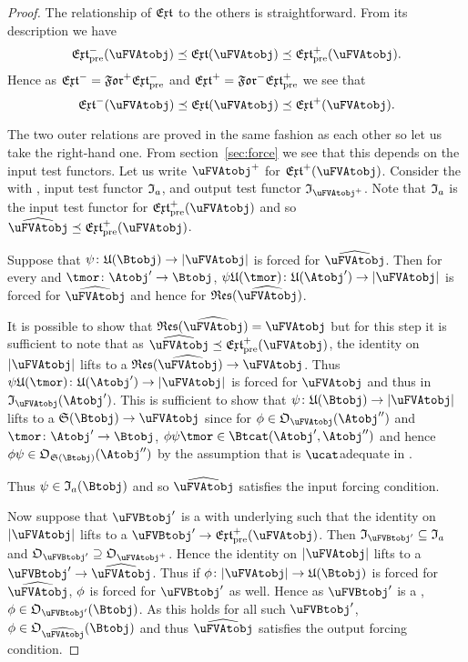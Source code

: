 \documentclass[%
12pt,%
arxiv,%
defaults
]{myclass}
\begin{document}
\begin{proof}
The relationship of \(\extfunc\) to the others is straightforward.
From its description we have
%
\[
  \PMextfunc(\uFVAtobj) \preceq \extfunc(\uFVAtobj) \preceq \PJextfunc(\uFVAtobj).
\]
%
Hence as \(\Mextfunc = \Mforfunc \PMextfunc\) and \(\Jextfunc = \Jforfunc \PJextfunc\) we see that
%
\[
  \Mextfunc(\uFVAtobj) \preceq \extfunc(\uFVAtobj) \preceq \Jextfunc(\uFVAtobj).
\]

The two outer relations are proved in the same fashion as each other so let us take the right\hyp{}hand one.
From section~\ref{sec:force} we see that this depends on the input test functors.
Let us write \(\mMo{\uFVAtobj}\) for \(\Jextfunc(\uFVAtobj)\).
Consider the \uVBtobj[\widehat{\uFVAtobj}] with \uobj[{\forfunc[\uFVAtobj]}], input test functor \(\itest_a\), and output test functor \(\itest_{\mMo{\uFVAtobj}}\).
Note that \(\itest_a\) is the input test functor for \(\PJextfunc(\uFVAtobj)\) and so \(\widehat{\uFVAtobj} \preceq \PJextfunc(\uFVAtobj)\).

Suppose that \(\ifn \colon \ufunc(\Btobj) \to \forfunc[\uFVAtobj]\) is forced for \(\widehat{\uFVAtobj}\).
Then for every \Atobj[\Atobj'] and \tmor \(\tmor \colon \Atobj' \to \Btobj\), \(\ifn \ufunc(\tmor) \colon \ufunc(\Atobj') \to \forfunc[\uFVAtobj]\) is forced for \(\widehat{\uFVAtobj}\) and hence for \(\resfunc(\widehat{\uFVAtobj})\).

It is possible to show that \(\resfunc(\widehat{\uFVAtobj}) = \uFVAtobj\) but for this step it is sufficient to note that as \(\widehat{\uFVAtobj} \preceq \PJextfunc(\uFVAtobj)\), the identity on \(\forfunc[\uFVAtobj]\) lifts to a \uFVAtmor \(\resfunc(\widehat{\uFVAtobj}) \to \uFVAtobj\).
Thus \(\ifn \ufunc(\tmor) \colon \ufunc(\Atobj') \to \forfunc[\uFVAtobj]\) is forced for \(\uFVAtobj\) and thus in \(\itest_{\uFVAtobj}(\Atobj')\).
This is sufficient to show that \(\ifn \colon \ufunc(\Btobj) \to \forfunc[\uFVAtobj]\) lifts to a \uVAtmor \(\sfunc(\Btobj) \to \uFVAtobj\) since for \(\ofn \in \otest_{\uFVAtobj}(\Atobj'')\) and \(\tmor \colon \Atobj' \to \Btobj\), \(\ofn \ifn \tmor \in \Hom{\Btcat}{\Atobj'}{\Atobj''}\) and hence \(\ofn \ifn \in \otest_{\sfunc(\Btobj)}(\Atobj'')\) by the assumption that \Atcat is \(\ucat\)\enhyp{}adequate in \Btcat.

Thus \(\ifn \in \itest_a(\Btobj)\) and so \(\widehat{\uFVAtobj}\) satisfies the input forcing condition.

Now suppose that \(\uFVBtobj'\) is a \uFVBtobj with underlying \uobj[{\forfunc[\uFVAtobj]}] such that the identity on \(\forfunc[\uFVAtobj]\) lifts to a \uVBtmor \(\uFVBtobj' \to \PJextfunc(\uFVAtobj)\).
Then \(\itest_{\uFVBtobj'} \subseteq \itest_a\) and \(\otest_{\uFVBtobj'} \supseteq \otest_{\mMo{\uFVAtobj}}\).
Hence the identity on \(\forfunc[\uFVAtobj]\) lifts to a \uVBtmor \(\uFVBtobj' \to \widehat{\uFVAtobj}\).
Thus if \(\ofn \colon \forfunc[\uFVAtobj] \to \ufunc(\Btobj)\) is forced for \(\widehat{\uFVAtobj}\), \(\phi\) is forced for \(\uFVBtobj'\) as well.
Hence as \(\uFVBtobj'\) is a \uFVBtobj, \(\ofn \in \otest_{\uFVBtobj'}(\Btobj)\).
As this holds for all such \(\uFVBtobj'\), \(\ofn \in \otest_{\widehat{\uFVAtobj}}(\Btobj)\) and thus \(\widehat{\uFVAtobj}\) satisfies the output forcing condition.


\end{proof}
\end{document}
